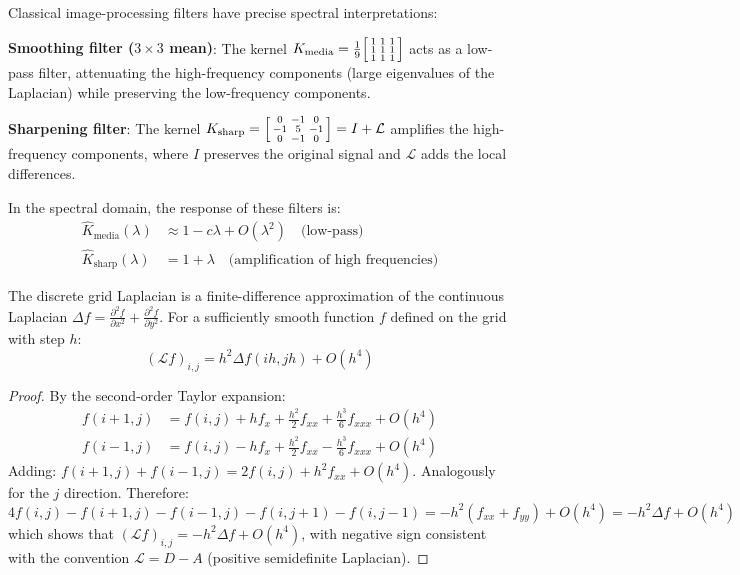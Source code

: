 \begin{example}\label{ex:filtros_paso_bajo_alto}
Classical image-processing filters have precise spectral interpretations:

\textbf{Smoothing filter ($3 \times 3$ mean)}: The kernel $K_{\text{media}} = \frac{1}{9}\begin{bsmallmatrix} 1 & 1 & 1 \\ 1 & 1 & 1 \\ 1 & 1 & 1 \end{bsmallmatrix}$ acts as a low-pass filter, attenuating the high-frequency components (large eigenvalues of the Laplacian) while preserving the low-frequency components.

\textbf{Sharpening filter}: The kernel $K_{\text{sharp}} = \begin{bsmallmatrix} 0 & -1 & 0 \\ -1 & 5 & -1 \\ 0 & -1 & 0 \end{bsmallmatrix} = I + \mathcal{L}$ amplifies the high-frequency components, where $I$ preserves the original signal and $\mathcal{L}$ adds the local differences.

In the spectral domain, the response of these filters is:
\begin{align}
\hat{K}_{\text{media}}(\lambda) &\approx 1 - c\lambda + O(\lambda^2) \quad \text{(low-pass)} \\
\hat{K}_{\text{sharp}}(\lambda) &= 1 + \lambda \quad \text{(amplification of high frequencies)}
\end{align}
\end{example}

\begin{proposition}\label{prop:laplaciano_discreto_continuo}
The discrete grid Laplacian is a finite-difference approximation of the continuous Laplacian $\Delta f = \frac{\partial^2 f}{\partial x^2} + \frac{\partial^2 f}{\partial y^2}$. For a sufficiently smooth function $f$ defined on the grid with step $h$:
\[
(\mathcal{L}f)_{i,j} = h^2 \Delta f(ih, jh) + O(h^4)
\]
\end{proposition}

\begin{proof}
By the second-order Taylor expansion:
\begin{align}
f(i+1,j) &= f(i,j) + h f_x + \frac{h^2}{2}f_{xx} + \frac{h^3}{6}f_{xxx} + O(h^4) \\
f(i-1,j) &= f(i,j) - h f_x + \frac{h^2}{2}f_{xx} - \frac{h^3}{6}f_{xxx} + O(h^4)
\end{align}
Adding: $f(i+1,j) + f(i-1,j) = 2f(i,j) + h^2 f_{xx} + O(h^4)$. Analogously for the $j$ direction. Therefore:
\[
4f(i,j) - f(i+1,j) - f(i-1,j) - f(i,j+1) - f(i,j-1) = -h^2(f_{xx} + f_{yy}) + O(h^4) = -h^2 \Delta f + O(h^4)
\]
which shows that $(\mathcal{L}f)_{i,j} = -h^2 \Delta f + O(h^4)$, with negative sign consistent with the convention $\mathcal{L} = D - A$ (positive semidefinite Laplacian).
\end{proof}

